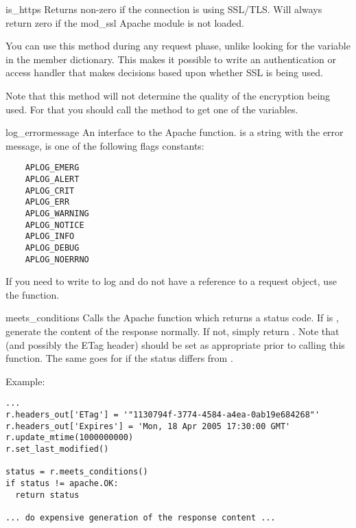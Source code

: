 \begin{methoddesc}[request]{is_https}{}
  Returns non-zero if the connection is using SSL/TLS. Will always return
  zero if the mod_ssl Apache module is not loaded.

  You can use this method during any request phase, unlike looking for
  the  variable in the  member dictionary.
  This makes it possible to write an authentication or access handler
  that makes decisions based upon whether SSL is being used.

  Note that this method will not determine the quality of the
  encryption being used.  For that you should call the 
  method to get one of the  variables.

\end{methoddesc}

\begin{methoddesc}[request]{log_error}{message}
  An interface to the Apache 
  function.  is a string with the error message,
   is one of the following flags constants:

  \begin{verbatim}
    APLOG_EMERG
    APLOG_ALERT
    APLOG_CRIT
    APLOG_ERR
    APLOG_WARNING
    APLOG_NOTICE
    APLOG_INFO
    APLOG_DEBUG
    APLOG_NOERRNO
  \end{verbatim}            

  If you need to write to log and do not have a reference to a request object,
  use the  function.
\end{methoddesc}

\begin{methoddesc}[request]{meets_conditions}{}
  Calls the Apache  function which returns
  a status code. If  is , generate the
  content of the response normally. If not, simply return .
  Note that  (and possibly the ETag header) should be set as
  appropriate prior to calling this function. The same goes for
   if the status differs from .

  Example:
  \begin{verbatim}
...
r.headers_out['ETag'] = '"1130794f-3774-4584-a4ea-0ab19e684268"'
r.headers_out['Expires'] = 'Mon, 18 Apr 2005 17:30:00 GMT'
r.update_mtime(1000000000)
r.set_last_modified()

status = r.meets_conditions()
if status != apache.OK:
  return status

... do expensive generation of the response content ... 
\end{verbatim}

\end{methoddesc}



